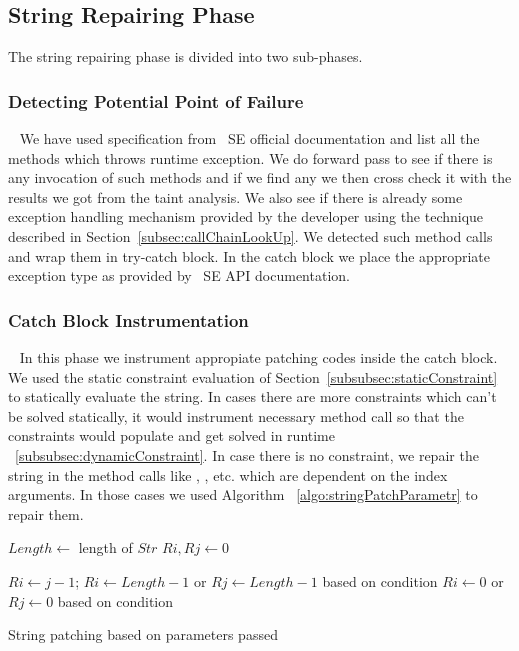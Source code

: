 \subsection{String Repairing Phase}
\label{subsec:stringReepairing}

The string repairing phase is divided into two sub-phases.

\subsubsection{Detecting Potential Point of Failure}
\label{subsub:detectingFailure}
~\newline
We have used specification from \java\ SE official documentation and list all
the methods which throws runtime exception. We do forward pass to see if there 
is any invocation of such methods and if we find any we then cross check it 
with the results we got from the taint analysis. We also see if there is already
some exception handling mechanism provided by the developer using the technique 
described in Section~\ref{subsec:callChainLookUp}. We detected such method calls
and wrap them in try-catch block. In the catch block we place the appropriate
exception type as provided by \java\ SE API documentation. 

\subsubsection{Catch Block Instrumentation}
\label{subsub:catchInstrumentation}
~\newline
In this phase we instrument appropiate patching codes inside the catch block.
We used the static constraint evaluation of
Section~\ref{subsubsec:staticConstraint} to statically evaluate the string. In
cases there are more constraints which can't be solved statically, it would instrument
necessary method call so that the constraints would populate and get solved in runtime
~\ref{subsubsec:dynamicConstraint}. In case there is no constraint, we repair the
string in the method calls like , ,  etc.
which are dependent on the index arguments. In those cases we used Algorithm
~\ref{algo:stringPatchParametr} to repair them.


\begin{algorithm}
\small
\DontPrintSemicolon
{}
\Begin
{
	$Length \longleftarrow$ length of $Str$\;
	{
		$Ri, Rj \longleftarrow 0$\;
	}
	\Else
	{
		{
			$Ri \longleftarrow j - 1$;
		}
		{
			$Ri \longleftarrow Length - 1$ or $Rj \longleftarrow Length - 1$ based on
			condition\; 
		}
		{
			$Ri \longleftarrow 0$ or $Rj \longleftarrow 0$ based on
			condition\; 
		}
		
		
	}	

}
\caption{String patching based on parameters passed}
\label{algo:stringPatchParametr}
\end{algorithm}